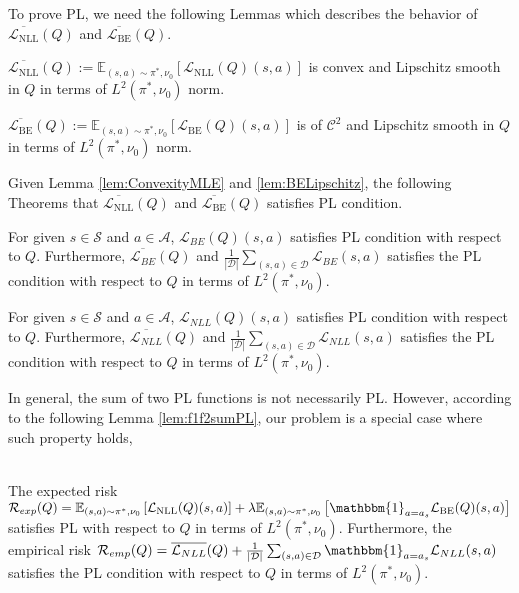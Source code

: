 \noindent To prove PL, we need the following Lemmas which describes the behavior of $\overline{\mathcal{L}_{\mathrm{NLL}}}(Q)$ and $\overline{\mathcal{L}_{\mathrm{BE}}}(Q)$.

\begin{lem}\label{lem:ConvexityMLE}
    $\overline{\mathcal{L}_{\mathrm{NLL}}}(Q):=\mathbb{E}_{(s, a)\sim \pi^*, \nu_0}  \left[\mathcal{L}_{\mathrm{NLL}}(Q)(s, a)\right]$ is convex and Lipschitz smooth in $Q$ in terms of $L^2(\pi^\ast, \nu_0)$ norm.
\end{lem}

\begin{lem} \label{lem:BELipschitz}
  $\overline{\mathcal{L}_{\mathrm{BE}}}(Q):=\mathbb{E}_{(s, a) \sim \pi^*, \nu_0}\left[\mathcal{L}_{\mathrm{BE}}(Q)(s, a)\right]$ is of $\mathcal{C}^2$ and Lipschitz smooth in $Q$ in terms of $L^2(\pi^\ast, \nu_0)$ norm.
\end{lem}
\noindent Given Lemma \ref{lem:ConvexityMLE} and \ref{lem:BELipschitz}, the following Theorems that $\overline{\mathcal{L}_{\mathrm{NLL}}}(Q)$ and $\overline{\mathcal{L}_{\mathrm{BE}}}(Q)$ satisfies PL condition.  

\begin{thm}\label{thm:BEenjoyPL} For given $s\in\mathcal{S}$ and $a\in\mathcal{A}$, $\mathcal{L}_{BE}(Q)(s,a)$ satisfies PL condition with respect to $Q$. Furthermore, 
   $\overline{\mathcal{L}_{BE}}(Q)$ and $\frac{1}{|\mathcal{D}|}\sum_{(s,a)\in\mathcal{D}}\mathcal{L}_{BE}(s,a)$ satisfies the PL condition with respect to $Q$ in terms of $L^2(\pi^\ast, \nu_0)$.
\end{thm}

\begin{thm}\label{thm:NLLenjoyPL} For given $s\in\mathcal{S}$ and $a\in\mathcal{A}$,
    $\mathcal{L}_{NLL}(Q)(s,a)$ satisfies PL condition with respect to $Q$. Furthermore, 
   $\overline{\mathcal{L}_{NLL}}(Q)$ and $\frac{1}{|\mathcal{D}|}\sum_{(s,a)\in\mathcal{D}}\mathcal{L}_{NLL}(s,a)$ satisfies the PL condition with respect to $Q$ in terms of $L^2(\pi^\ast, \nu_0)$.
\end{thm}
\noindent %
In general, the sum of two PL functions is not necessarily PL. However, according to the following Lemma \ref{lem:f1f2sumPL}, our problem is a special case where such property holds, 

\begin{lem}\label{lem:f1f2sumPL} \;
\\
The expected risk 
    $\mathcal{R}_{exp}(Q) = \mathbb{E}_{(s, a)\sim \pi^*, \nu_0}  \left[\mathcal{L}_{\mathrm{NLL}}(Q)(s, a)\right]+\lambda \mathbb{E}_{(s, a)\sim \pi^*, \nu_0}  \left[\mathbbm{1}_{a=a_s}\mathcal{L}_{\mathrm{BE}}(Q)(s, a)\right]$ satisfies PL with respect to $Q$ in terms of $L^2(\pi^\ast, \nu_0)$. Furthermore, the empirical risk $\mathcal{R}_{emp}(Q) = \overline{\mathcal{L}_{NLL}}(Q)+\frac{1}{|\mathcal{D}|}\sum_{(s,a)\in\mathcal{D}}\mathbbm{1}_{a=a_s}\mathcal{L}_{NLL}(s,a)$ satisfies the PL condition with respect to $Q$ in terms of $L^2(\pi^\ast, \nu_0)$.
\end{lem}

